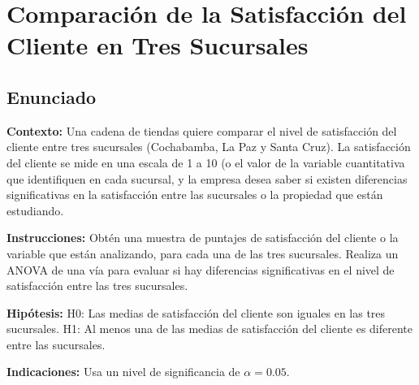\newpage
\section{Comparación de la Satisfacción del Cliente en Tres Sucursales}
\subsection{Enunciado}
\textbf{Contexto:}
Una cadena de tiendas quiere comparar el nivel de satisfacción del cliente entre tres sucursales (Cochabamba, La Paz y Santa Cruz).
La satisfacción del cliente se mide en una escala de 1 a 10 (o el valor de la variable cuantitativa que identifiquen en cada sucursal,
y la empresa desea saber si existen diferencias significativas en la satisfacción entre las sucursales o la propiedad que están estudiando.

\textbf{Instrucciones:}
Obtén una muestra de puntajes de satisfacción del cliente o la variable que están analizando, para cada una de las tres sucursales.
Realiza un ANOVA de una vía para evaluar si hay diferencias significativas en el nivel de satisfacción entre las tres sucursales.

\textbf{Hipótesis:}
H0: Las medias de satisfacción del cliente son iguales en las tres sucursales.
H1: Al menos una de las medias de satisfacción del cliente es diferente entre las sucursales.

\textbf{Indicaciones:}
Usa un nivel de significancia de \(\alpha=0.05.\)

